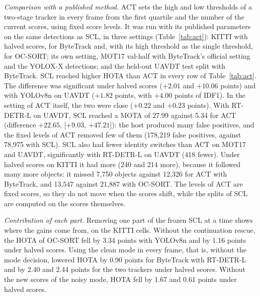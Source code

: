 \documentclass[pdflatex,sn-mathphys-num,iicol]{sn-jnl}
\newcommand{\scl}{SCL}
\begin{document}
\emph{Comparison with a published method.} ACT \cite{act2026adaptive} sets the
high and low thresholds of a two-stage tracker in every frame from the first
quartile and the number of the current scores, using fixed score levels. It
was run with its published parameters on the same detections as \scl{}, in
three settings (Table~\ref{tab:act}): KITTI with halved scores, for ByteTrack
and, with its high threshold as the single threshold, for OC-SORT; its own
setting, MOT17 val-half with ByteTrack's official setting and the YOLOX-X
detections; and the held-out UAVDT test split with ByteTrack. \scl{} reached
higher HOTA than ACT in every row of Table~\ref{tab:act}. The difference was
significant under halved scores ($+2.01$ and $+10.06$ points) and with
YOLOv8n on UAVDT ($+1.82$ points, with $+4.00$ points of IDF1). In the setting
of ACT itself, the two were close ($+0.22$ and $+0.23$ points). With RT-DETR-L
on UAVDT, \scl{} reached a MOTA of 27.99 against 5.34 for ACT (difference
$+22.65$, [$+9.03$, $+47.21$]): the host produced many false positives, and
the fixed levels of ACT removed few of them (178,219 false positives, against
78,975 with \scl{}). \scl{} also had fewer identity switches than ACT on MOT17 and UAVDT,
significantly with RT-DETR-L on UAVDT (418 fewer). Under halved scores on
KITTI it had more (240 and 214 more), because it followed many more objects:
it missed 7,750 objects against 12,326 for ACT with ByteTrack, and 13,547
against 21,887 with OC-SORT. The levels of ACT are fixed scores, so they do
not move when the scores shift, while the splits of \scl{} are computed on
the scores themselves.

\emph{Contribution of each part.} Removing one part of the frozen \scl{} at
a time shows where the gains come from, on the KITTI cells. Without the
continuation rescue, the HOTA of OC-SORT fell by 3.34 points with YOLOv8n and
by 1.16 points under halved scores. Using the clean mode in every frame,
that is, without the mode decision, lowered HOTA by 0.90 points
for ByteTrack with RT-DETR-L and by 2.40 and 2.44 points for the two trackers
under halved scores. Without the new scores of the noisy mode, HOTA fell by
1.67 and 0.61 points under halved scores.
\end{document}
